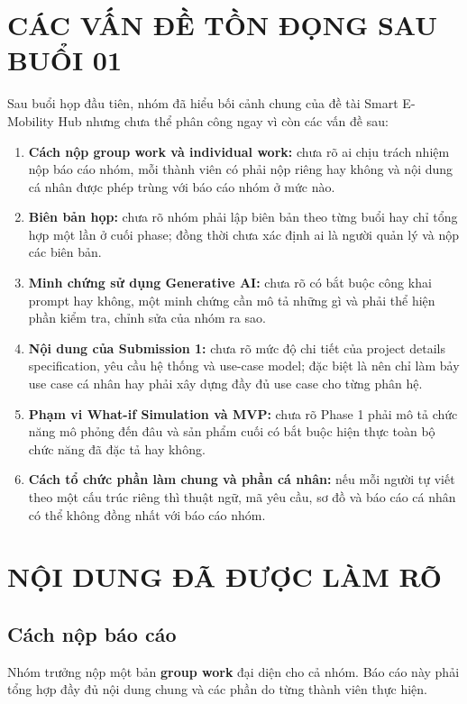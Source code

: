 \documentclass[10pt,a4paper]{article}
\begin{document}
\section{CÁC VẤN ĐỀ TỒN ĐỌNG SAU BUỔI 01}

Sau buổi họp đầu tiên, nhóm đã hiểu bối cảnh chung của đề tài Smart E-Mobility Hub nhưng chưa thể phân công ngay vì còn các vấn đề sau:

\begin{enumerate}
  \item \textbf{Cách nộp group work và individual work:} chưa rõ ai chịu trách nhiệm nộp báo cáo nhóm, mỗi thành viên có phải nộp riêng hay không và nội dung cá nhân được phép trùng với báo cáo nhóm ở mức nào.
  \item \textbf{Biên bản họp:} chưa rõ nhóm phải lập biên bản theo từng buổi hay chỉ tổng hợp một lần ở cuối phase; đồng thời chưa xác định ai là người quản lý và nộp các biên bản.
  \item \textbf{Minh chứng sử dụng Generative AI:} chưa rõ có bắt buộc công khai prompt hay không, một minh chứng cần mô tả những gì và phải thể hiện phần kiểm tra, chỉnh sửa của nhóm ra sao.
  \item \textbf{Nội dung của Submission 1:} chưa rõ mức độ chi tiết của project details specification, yêu cầu hệ thống và use-case model; đặc biệt là nên chỉ làm bảy use case cá nhân hay phải xây dựng đầy đủ use case cho từng phân hệ.
  \item \textbf{Phạm vi What-if Simulation và MVP:} chưa rõ Phase 1 phải mô tả chức năng mô phỏng đến đâu và sản phẩm cuối có bắt buộc hiện thực toàn bộ chức năng đã đặc tả hay không.
  \item \textbf{Cách tổ chức phần làm chung và phần cá nhân:} nếu mỗi người tự viết theo một cấu trúc riêng thì thuật ngữ, mã yêu cầu, sơ đồ và báo cáo cá nhân có thể không đồng nhất với báo cáo nhóm.
\end{enumerate}

\section{NỘI DUNG ĐÃ ĐƯỢC LÀM RÕ}

\subsection{Cách nộp báo cáo}

Nhóm trưởng nộp một bản \textbf{group work} đại diện cho cả nhóm. Báo cáo này phải tổng hợp đầy đủ nội dung chung và các phần do từng thành viên thực hiện.
\end{document}
